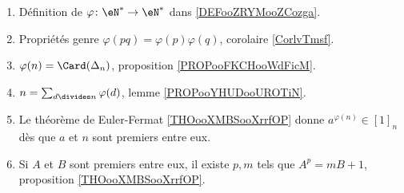 		\label{THMooUDYMooCCXdbw}
\begin{enumerate}
	\item
	      Définition de \(\varphi \colon \eN^*\to \eN^*  \) dans \ref{DEFooZRYMooZCozga}.
	\item
	      Propriétés genre \( \varphi(pq)=\varphi(p)\varphi(q)\), corolaire \ref{CorlvTmsf}.
	\item
	      \( \varphi(n)=\Card(\Delta_n)\), proposition \ref{PROPooFKCHooWdFicM}.
	\item
	      \( n=\sum_{d\divides n}\varphi(d)\), lemme \ref{PROPooYHUDooUROTiN}.
	\item
	      Le théorème de Euler-Fermat \ref{THOooXMBSooXrrfOP} donne \( a^{\varphi(n)}\in[1]_n\) dès que \( a\) et \( n\) sont premiers entre eux.
	\item
	      Si \( A\) et \( B\) sont premiers entre eux, il existe \( p,m\) tels que \( A^p=mB+1\), proposition \ref{THOooXMBSooXrrfOP}.
\end{enumerate}
